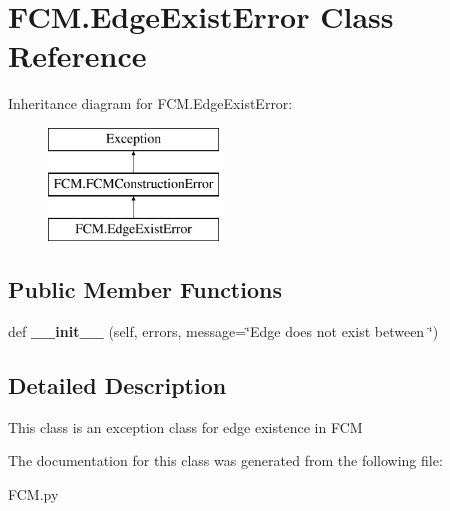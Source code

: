 \hypertarget{class_f_c_m_1_1_edge_exist_error}{}\section{F\+C\+M.\+Edge\+Exist\+Error Class Reference}
\label{class_f_c_m_1_1_edge_exist_error}
Inheritance diagram for F\+C\+M.\+Edge\+Exist\+Error\+:\begin{figure}[H]
\begin{center}
\leavevmode
\includegraphics[height=3.000000cm]{class_f_c_m_1_1_edge_exist_error}
\end{center}
\end{figure}
\subsection*{Public Member Functions}
\begin{DoxyCompactItemize}
\item 
\hypertarget{class_f_c_m_1_1_edge_exist_error_aa7e4597cfa49f631e9fdcad821c02aed}{}\label{class_f_c_m_1_1_edge_exist_error_aa7e4597cfa49f631e9fdcad821c02aed} 
def {\bfseries \+\_\+\+\_\+init\+\_\+\+\_\+} (self, errors, message=\char`\"{}Edge does not exist between \char`\"{})
\end{DoxyCompactItemize}


\subsection{Detailed Description}
\begin{DoxyVerb}This class is an exception class for edge existence in FCM
\end{DoxyVerb}
 

The documentation for this class was generated from the following file\+:\begin{DoxyCompactItemize}
\item 
F\+C\+M.\+py\end{DoxyCompactItemize}
